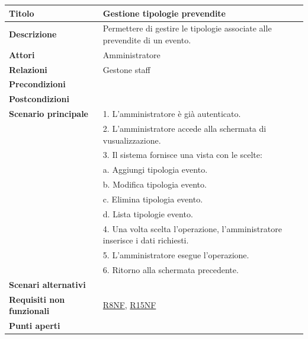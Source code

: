 \documentclass[a4paper]{article}
\begin{document}
\begin{center}
\begin{tabularx}{1\textwidth}{|l|X|}
    \hline
	\textbf{Titolo} & Gestione tipologie prevendite \\
	\hline
	\textbf{Descrizione} & Permettere di gestire le tipologie associate alle prevendite di un evento. \\
	\hline
	\textbf{Attori} & Amministratore \\
	\hline
	\textbf{Relazioni} & Gestone staff \\
	\hline
	\textbf{Precondizioni} &  \\
	\hline
	\textbf{Postcondizioni} &  \\
	\hline
	\textbf{Scenario principale} & 1. L'amministratore è già autenticato.\\
	                             & 2. L'amministratore accede alla schermata di vusualizzazione. \\
								 & 3. Il sistema fornisce una vista con le scelte: \\
								 & \quad a. Aggiungi tipologia evento.\\
								 & \quad b. Modifica tipologia evento.\\
								 & \quad c. Elimina tipologia evento.\\
								 & \quad d. Lista tipologie evento.\\
								 & 4. Una volta scelta l'operazione, l'amministratore inserisce i dati richiesti. \\
								 & 5. L'amministratore esegue l'operazione.\\
								 & 6. Ritorno alla schermata precedente.\\
	\hline
	\textbf{Scenari alternativi} & \\
	\hline
	\textbf{Requisiti non funzionali} & \hyperlink{R8NF}{R8NF}, \hyperlink{R15NF}{R15NF} \\
	\hline
	\textbf{Punti aperti} & \\
	\hline
\end{tabularx}
\end{center}

\end{document}
